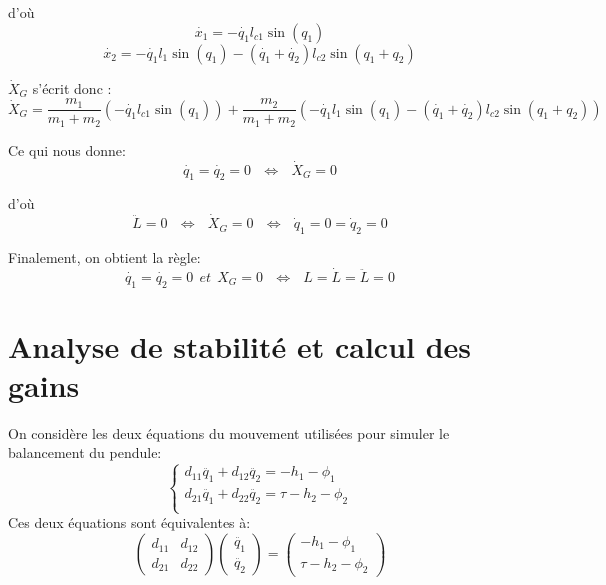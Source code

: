 \documentclass[a4paper,12pt]{report}
\begin{document}
d'où
$$
\dot{x_1} = - \dot{q_1} l_{c1} \sin(q_1)
$$
$$
\dot{x_2} = - \dot{q_1} l_{1} \sin(q_1) - (\dot{q_1} + \dot{q_2}) l_{c2} \sin(q_1 + q_2)
$$

$\dot{X}_G$ s'écrit donc  :
$$\dot{X}_G = \frac{m_1}{m_1 + m_2} (- \dot{q_1} l_{c1} \sin(q_1)) + \frac{m_2}{m_1 + m_2} (- \dot{q_1} l_{1} \sin(q_1) - (\dot{q_1} + \dot{q_2}) l_{c2} \sin(q_1 + q_2))$$

Ce qui nous donne:
$$\dot{q_1} = \dot{q_2} = 0 \ \ \ \Leftrightarrow \ \ \ \dot{X}_G = 0$$

d'où
$$
 \ddot{L} = 0 \ \ \ \Leftrightarrow \ \ \ \dot{X}_G = 0 \ \ \ \Leftrightarrow \ \ \  \dot{q}_1 = 0 =\dot{q}_2 = 0
$$

Finalement, on obtient la règle:
$$\dot{q_1} = \dot{q_2} = 0 \ \ et  \ \ X_G = 0  \ \ \ \Leftrightarrow \ \ \ L = \dot{L} = \ddot{L} = 0$$


\section*{Analyse de stabilité et calcul des gains}
On considère les deux équations du mouvement utilisées pour simuler le balancement du pendule:
$$
\left\{
    \begin{array}{ll}
        d_{11}\ddot{q_1} + d_{12}\ddot{q_2} = -h_1 - \phi_1  \\
        d_{21}\ddot{q_1} + d_{22}\ddot{q_2} = \tau -h_2 - \phi_2  \\
    \end{array}
\right.
$$
Ces deux équations sont équivalentes à:
$$
    \begin{pmatrix}
    d_{11} & d_{12} \\
    d_{21} & d_{22}
    \end{pmatrix}
    \begin{pmatrix}
    \ddot{q_1} \\
    \ddot{q_2}
    \end{pmatrix}
    =
    \begin{pmatrix}
    -h_1 - \phi_1 \\
    \tau -h_2 - \phi_2
    \end{pmatrix}
$$
\end{document}
